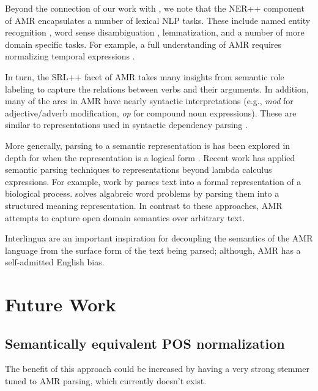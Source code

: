 \documentclass[11pt]{article}
\newcommand\e[1]{\textit{#1}} %
\begin{document}

Beyond the connection of our work with , we note that 
the NER++ component of AMR encapsulates a number of lexical NLP tasks.
These include named entity recognition \cite{2007nadeau-ner,stanford-ner},
  word sense disambiguation \cite{1995yarowsky-wsd,2002banerjee-wsd},
  lemmatization, and a number of more domain specific tasks.
For example, a full understanding of AMR requires normalizing temporal
  expressions \cite{2010verhagen-tempeval,2010strotgen-temporal,2012chang-temporal}.
 
In turn, the SRL++ facet of AMR takes many insights from semantic role labeling
  \cite{2002gildea-srl,2004punyakanok-srl,srikumar2013-srl} to capture the
  relations between verbs and their arguments.
In addition, many of the arcs in AMR have nearly syntactic interpretations
  (e.g., \e{mod} for adjective/adverb modification, \e{op} for compound noun
  expressions).
These are similar to representations used in syntactic dependency parsing
  \cite{stanford-dependencies,2005mcdonald-dependency0,2006buchholz-conll}.

More generally, parsing to a semantic representation is has been explored in
  depth for when the representation is a logical form
  \cite{2005kate-semantics,2005zettlemoyer-semantics,2011liang-semantics}.
Recent work has applied semantic parsing techniques to representations beyond
  lambda calculus expressions.
For example, work by  parses
  text into a formal representation of a biological process.
 solves algabreic word problems by parsing them
  into a structured meaning representation.
In contrast to these approaches, AMR attempts to capture open domain semantics
  over arbitrary text.

Interlingua
  \cite{1991mitamura-interlingua,1999carbonell-interlingua,1998levin-interlingua}
  are an important inspiration for decoupling the semantics of the AMR language
  from the surface form of the text being parsed; although, AMR has a self-admitted
  English bias.


\section{Future Work}
\subsection{Semantically equivalent POS normalization}
The benefit of this approach could be increased by having a very strong stemmer tuned to AMR parsing, which currently doesn't exist.
\end{document}
